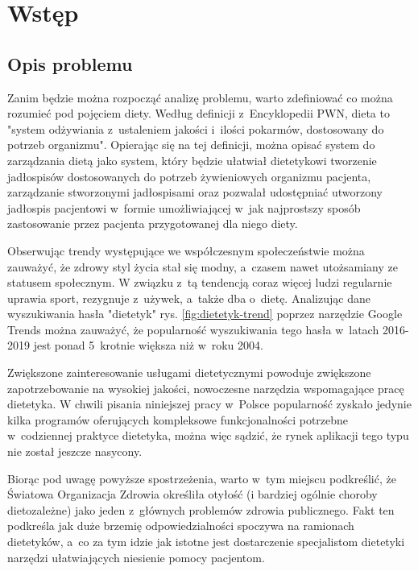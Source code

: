 \chapter*{Wstęp}\label{ch:admission}

\section*{Opis problemu}\label{sec:problem-description}

Zanim będzie można rozpocząć analizę problemu, warto zdefiniować co można rozumieć pod pojęciem diety.
Według definicji z~Encyklopedii PWN, dieta to "system odżywiania z~ustaleniem jakości i~ilości pokarmów, dostosowany do potrzeb organizmu"\cite{book:pwn-dietetyk}. 
Opierając się na tej definicji, można opisać system do zarządzania dietą jako system, który będzie ułatwiał dietetykowi tworzenie jadłospisów dostosowanych do potrzeb żywieniowych organizmu pacjenta, zarządzanie stworzonymi jadłospisami oraz pozwalał udostępniać utworzony jadłospis pacjentowi w~formie umożliwiającej w~jak najprostszy sposób zastosowanie przez pacjenta przygotowanej dla niego diety.

\par
Obserwując trendy występujące we współczesnym społeczeństwie można zauważyć, że zdrowy styl życia stał się modny, a~czasem nawet utożsamiany ze statusem społecznym.
W związku z~tą tendencją coraz więcej ludzi regularnie uprawia sport, rezygnuje z~używek, a~także dba o~dietę.
Analizując dane wyszukiwania hasła "dietetyk" rys. \ref{fig:dietetyk-trend} poprzez narzędzie Google Trends\cite{url:google-trends} można zauważyć, że popularność wyszukiwania tego hasła w~latach 2016-2019 jest ponad 5~krotnie większa niż w~roku 2004.

Zwiększone zainteresowanie usługami dietetycznymi powoduje zwiększone zapotrzebowanie na wysokiej jakości, nowoczesne narzędzia wspomagające pracę dietetyka.
W chwili pisania niniejszej pracy w~Polsce popularność zyskało jedynie kilka programów oferujących kompleksowe funkcjonalności potrzebne w~codziennej praktyce dietetyka, można więc sądzić, że rynek aplikacji tego typu nie został jeszcze nasycony.

\par
Biorąc pod uwagę powyższe spostrzeżenia, warto w~tym miejscu podkreślić, że Światowa Organizacja Zdrowia określiła otyłość (i bardziej ogólnie choroby dietozależne) jako jeden z~głównych problemów zdrowia publicznego\cite{article:dietetyk-na-rynku-uslug-medycznych}.
Fakt ten podkreśla jak duże brzemię odpowiedzialności spoczywa na ramionach dietetyków, a~co za tym idzie jak istotne jest dostarczenie specjalistom dietetyki narzędzi ułatwiających niesienie pomocy pacjentom.

